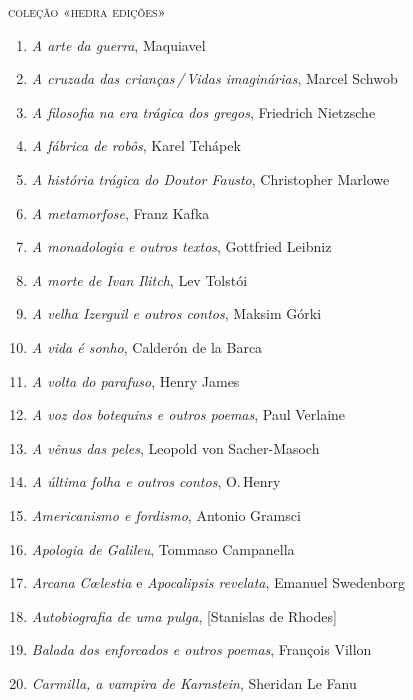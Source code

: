 \pagebreak
\blankAteven
\pagestyle{empty}
\begingroup
\rmfamily
\fontsize{7}{8}\selectfont

\color{black}


{\large\textsc{coleção «hedra edições»}}


\makeatletter
\renewcommand{\labelenumi}{}
\renewcommand{\labelenumii}{}
\renewcommand{\labelenumiii}{}
\makeatother

\begin{enumerate}
\setlength{\topsep}{2pt}
\setlength{\partopsep}{0pt}
\setlength\parskip{4.2pt}
\setlength\itemsep{-1.4mm}
\item \textit{A arte da guerra}, Maquiavel
\item \textit{A cruzada das crianças\,/\,Vidas imaginárias}, Marcel Schwob
\item \textit{A filosofia na era trágica dos gregos}, Friedrich Nietzsche
\item \textit{A fábrica de robôs}, Karel Tchápek 
\item \textit{A história trágica do Doutor Fausto}, Christopher Marlowe
\item \textit{A metamorfose}, Franz Kafka
\item \textit{A monadologia e outros textos}, Gottfried Leibniz
\item \textit{A morte de Ivan Ilitch}, Lev Tolstói 
\item \textit{A velha Izerguil e outros contos}, Maksim Górki
\item \textit{A vida é sonho}, Calderón de la Barca
\item \textit{A volta do parafuso}, Henry James
\item \textit{A voz dos botequins e outros poemas}, Paul Verlaine 
\item \textit{A vênus das peles}, Leopold von Sacher{}-Masoch
\item \textit{A última folha e outros contos}, O.\,Henry
\item \textit{Americanismo e fordismo}, Antonio Gramsci
\item \textit{Apologia de Galileu}, Tommaso Campanella 
\item \textit{Arcana C\oe lestia} e \textit{Apocalipsis revelata}, Emanuel Swedenborg
\item \textit{Autobiografia de uma pulga}, [Stanislas de Rhodes]
\item \textit{Balada dos enforcados e outros poemas}, François Villon
\item \textit{Carmilla, a vampira de Karnstein}, Sheridan Le Fanu

\end{enumerate}
